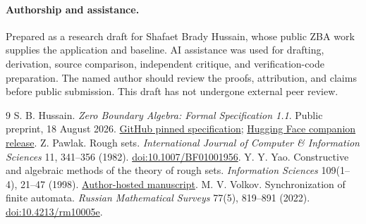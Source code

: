 \documentclass[11pt,a4paper]{article}
\begin{document}
\paragraph{Authorship and assistance.}
Prepared as a research draft for Shafaet Brady Hussain, whose public ZBA work supplies the application and baseline. AI assistance was used for drafting, derivation, source comparison, independent critique, and verification-code preparation. The named author should review the proofs, attribution, and claims before public submission. This draft has not undergone external peer review.

\begin{thebibliography}{9}
 S. B. Hussain. \emph{Zero Boundary Algebra: Formal Specification 1.1}. Public preprint, 18 August 2026. \href{https://github.com/ResearchForumOnline/research/blob/2991a3c97d9bb3d6c27f3fd7674ae93020f2a49a/papers/zero-boundary-algebra-formal-specification-1.1.md}{GitHub pinned specification}; \href{https://huggingface.co/datasets/researchforumonline/zero-boundary-algebra}{Hugging Face companion release}.
 Z. Pawlak. Rough sets. \emph{International Journal of Computer \& Information Sciences} 11, 341--356 (1982). \href{https://doi.org/10.1007/BF01001956}{doi:10.1007/BF01001956}.
 Y. Y. Yao. Constructive and algebraic methods of the theory of rough sets. \emph{Information Sciences} 109(1--4), 21--47 (1998). \href{https://www2.cs.uregina.ca/~yyao/PAPERS/is_constructive.pdf}{Author-hosted manuscript}.
 M. V. Volkov. Synchronization of finite automata. \emph{Russian Mathematical Surveys} 77(5), 819--891 (2022). \href{https://doi.org/10.4213/rm10005e}{doi:10.4213/rm10005e}.
\end{thebibliography}
\end{document}
